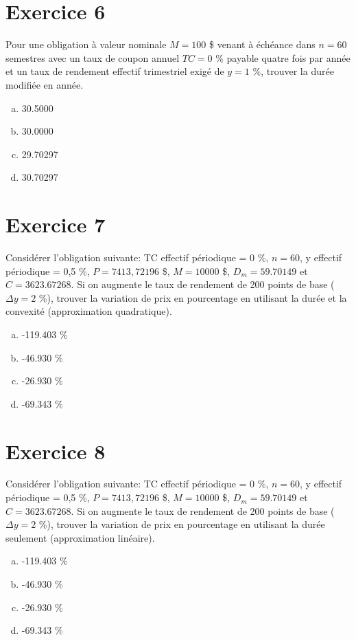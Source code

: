 \documentclass[10pt,a4paper]{article}
\begin{document}
\section*{Exercice 6}
Pour une obligation à valeur nominale $M = 100$ \$ venant à échéance dans $n = 60$ semestres avec un taux de coupon annuel $TC = 0$ \% payable quatre fois par année et un taux de rendement effectif trimestriel exigé de $y = 1$ \%,  trouver la durée modifiée en année.

\begin{enumerate}[a)]
\item 30.5000
\item 30.0000
\item 29.70297 
\item 30.70297 
\end{enumerate}

\newpage

\section*{Exercice 7}
Considérer l’obligation suivante: TC effectif périodique = 0 \%, $n = 60$, y effectif périodique = 0,5 \%, $P = 7413,72196$ \$, $M= 10000$ \$, $D_m = 59.70149$ et $C = 3623.67268$.  Si on augmente le taux de rendement de 200 points de base ($\Delta y = 2$  \%),  trouver la variation de prix en pourcentage en utilisant la durée et la convexité (approximation quadratique). 

\begin{enumerate}[a)]
\item -119.403 \%
\item -46.930 \%
\item -26.930 \%
\item -69.343 \%
\end{enumerate}

\section*{Exercice 8}
Considérer l’obligation suivante: TC effectif périodique = 0 \%, $n = 60$, y effectif périodique = 0,5 \%, $P = 7413,72196$ \$, $M= 10000$ \$, $D_m = 59.70149$ et $C = 3623.67268$.  Si on augmente le taux de rendement de 200 points de base ($\Delta y = 2$  \%),  trouver la variation de prix en pourcentage en utilisant la durée seulement (approximation linéaire).

\begin{enumerate}[a)]
\item -119.403 \%
\item -46.930 \%
\item -26.930 \%
\item -69.343 \%
\end{enumerate}
\end{document}
